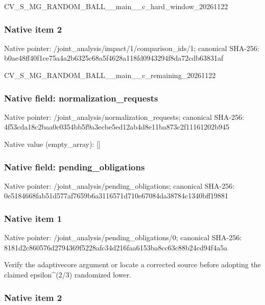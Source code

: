 \documentclass[10pt,a4paper]{article}
\begin{document}
CV\_S\_MG\_RANDOM\_BALL\_\_mai\allowbreak{}n\_\_c\_hard\_window\_2026112\allowbreak{}2


\subsubsection{Native item 2}


Native pointer: /joint\_analysis/impact/1\allowbreak{}/comparison\_ids/1; canonical SHA-256: b0ae48ff40f1ce75a4a2b632\allowbreak{}5c68a5f4628a118fd0943294\allowbreak{}f8da72cdb63831af


CV\_S\_MG\_RANDOM\_BALL\_\_mai\allowbreak{}n\_\_c\_remaining\_20261122


\subsubsection{Native field: normalization\_requests}


Native pointer: /joint\_analysis/normalization\_requests; canonical SHA-256: 4f53cda18c2baa0c0354bb5f\allowbreak{}9a3ecbe5ed12ab4d8e11ba87\allowbreak{}3c2f11161202b945



Native value (empty\_array): []



\subsubsection{Native field: pending\_obligations}


Native pointer: /joint\_analysis/pending\_obligations; canonical SHA-256: 0e5184668fab51d577af7659\allowbreak{}b6a3116571d710e67084da38\allowbreak{}784c1340bff19881



\subsubsection{Native item 1}


Native pointer: /joint\_analysis/pending\_obligations/0; canonical SHA-256: 8181d2c860576d2794369f52\allowbreak{}28afc34d216faa6153ba8cc6\allowbreak{}3c88b24cd94f4a5a


Verify the adaptivecore argument or locate a corrected source before adopting the claimed epsilon\textasciicircum{}(2/3) randomized lower.


\subsubsection{Native item 2}
\end{document}
